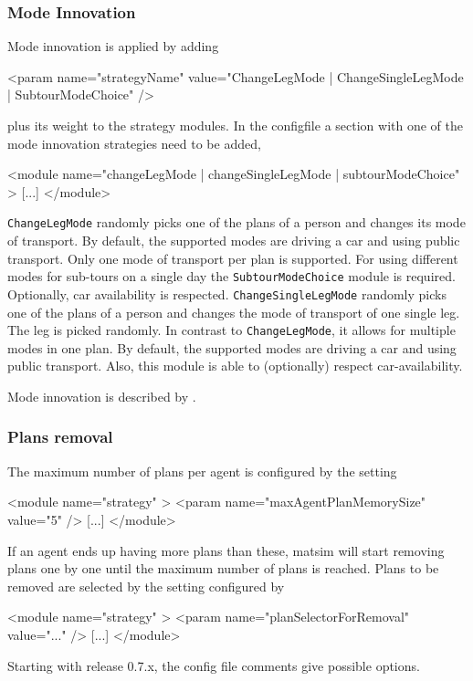 \subsubsection{Mode Innovation}
\label{sec:modechoice}
Mode innovation is applied by adding 
%
\begin{xml}
	<param name="strategyName" value="{ChangeLegMode | ChangeSingleLegMode | SubtourModeChoice}" />
\end{xml}
%
plus its weight to the strategy modules. In the \gls{configfile} a section with one of the mode innovation strategies need to be added, \ie 
%
\begin{xml}
<module name="{changeLegMode | changeSingleLegMode | subtourModeChoice}" >
    [...]
</module>
\end{xml}
%
\lstinline|ChangeLegMode| randomly picks one of the plans of a person and changes its mode of transport. By default, the supported modes are driving a car and using public transport. Only one mode of transport per plan is supported. For using different modes for sub-tours on a single day the \lstinline|SubtourModeChoice| module is required. Optionally, car availability is respected. \lstinline|ChangeSingleLegMode| randomly picks one of the plans of a person and changes the mode of transport of one single leg. The leg is picked randomly. In contrast to \lstinline|ChangeLegMode|, it allows for multiple modes in one plan. By default, the supported modes are driving a car and using public transport. Also, this module is able to (optionally) respect car-availability.

Mode innovation is described by \citet[][]{RieserEtAl_TRR_2009, MeisterEtAl_WCTRS_2010, CiariEtAl_STRC_2008, CiariEtAl_STRC_2007}.

\subsubsection{Plans removal}

The maximum number of plans per agent is configured by the setting 
\begin{xml}
<module name="strategy" >
   <param name="maxAgentPlanMemorySize" value="5" />
   [...]
</module>
\end{xml}
If an agent ends up having more plans than these, \gls{matsim} will start removing plans one by one until the maximum number of plans is reached.  Plans to be removed are selected by the setting configured by
\begin{xml}
<module name="strategy" >
   <param name="planSelectorForRemoval" value="..." />
   [...]
</module>
\end{xml}
Starting with release 0.7.x, the config file comments give possible options.

